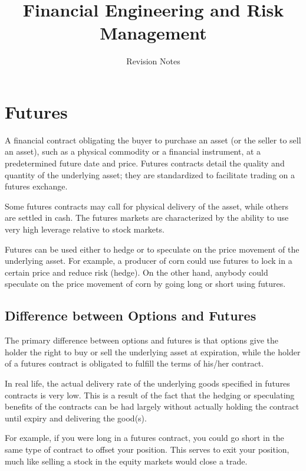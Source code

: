 \documentclass[11pt]{article} %
\title{Financial Engineering and Risk Management}
\author{Revision Notes}
\begin{document}
\maketitle
\tableofcontents


\section{Futures}

A financial contract obligating the buyer to purchase an asset (or the seller to sell an asset), such as a physical commodity or a financial instrument, at a predetermined future date and price. Futures contracts detail the quality and quantity of the underlying asset; they are standardized to facilitate trading on a futures exchange. 

Some futures contracts may call for physical delivery of the asset, while others are settled in cash. The futures markets are characterized by the ability to use very high leverage relative to stock markets. 

Futures can be used either to hedge or to speculate on the price movement of the underlying asset. For example, a producer of corn could use futures to lock in a certain price and reduce risk (hedge). On the other hand, anybody could speculate on the price movement of corn by going long or short using futures. 

\subsection*{Difference between Options and Futures}
The primary difference between options and futures is that options give the holder the right to buy or sell the underlying asset at expiration, while the holder of a futures contract is obligated to fulfill the terms of his/her contract. 

In real life, the actual delivery rate of the underlying goods specified in futures contracts is very low. This is a result of the fact that the hedging or speculating benefits of the contracts can be had largely without actually holding the contract until expiry and delivering the good(s). 

For example, if you were long in a futures contract, you could go short in the same type of contract to offset your position. This serves to exit your position, much like selling a stock in the equity markets would close a trade.
\end{document}

